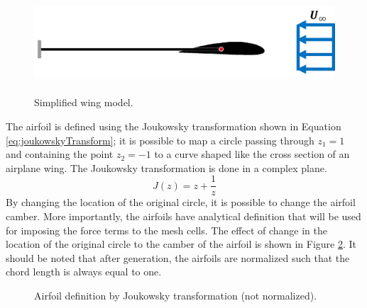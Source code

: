 \documentclass[12pt]{aiaa-pretty}
\begin{document}
%
\begin{figure}
	\centering
	\includegraphics[height=3.75cm]{figure/airfoil/airfoil.png}
	\caption{Simplified wing model.}
	\label{fig:wingModel}
\end{figure}
%

The airfoil is defined using the Joukowsky transformation shown in Equation \eqref{eq:joukowskyTransform}; it is possible to map a circle passing through $z_1 = 1$ and containing the point $z_2 = -1$ to a curve shaped like the cross section of an airplane wing. The Joukowsky transformation is done in a complex plane.
%
\begin{equation}\label{eq:joukowskyTransform}
J(z) = z + \frac{1}{z}
\end{equation}
%
By changing the location of the original circle, it is possible to change the airfoil camber. More importantly, the airfoils have analytical definition that will be used for imposing the force terms to the mesh cells. The effect of change in the location of the original circle to the camber of the airfoil is shown in Figure \ref{fig:joukowskiChamber}. It should be noted that after generation, the airfoils are normalized such that the chord length is always equal to one.\\

%
	\begin{figure}[H]
		\centering
		\quad
		\caption{Airfoil definition by Joukowsky transformation (not normalized).}
		\label{fig:joukowskiChamber}
	\end{figure}
%
\end{document}
